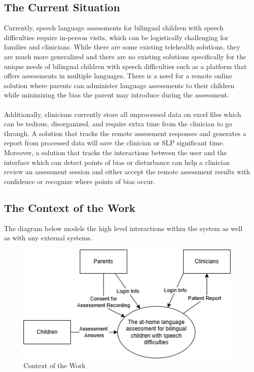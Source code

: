 \documentclass[12pt]{article}
\begin{document}
\subsection{The Current Situation}
\hspace{2em}Currently, speech language assessments for bilingual children with speech difficulties require in-person visits, which can be logistically challenging 
for families and clinicians. While there are some existing telehealth solutions, they are much more generalized and there are no existing solutions 
specifically for the unique needs of bilingual children with speech difficulties such as a platform that offers assessments in multiple languages. 
There is a need for a remote online solution where parents can administer language assessments to their children while minimizing the bias the parent 
may introduce during the assessment. \\\\
\indent Additionally, clinicians currently store all unprocessed data on excel files which can be tedious, disorganized, and require extra time from the clinician 
to go through. A solution that tracks the remote assessment responses and generates a report from processed data will save the clinician or SLP significant 
time. Moreover, a solution that tracks the interactions between the user and the interface which can detect points of bias or disturbance can help a clinician 
review an assessment session and either accept the remote assessment results with confidence or recognize where points of bias occur.

\newpage

\subsection{The Context of the Work}
\hspace{2em}The diagram below models the high level interactions within the system as well as with any external systems.
\begin{figure}[H]
  \centering
  \includegraphics[scale=0.7]{images/ContextoftheWork.png}
  \caption{Context of the Work}
\end{figure}
\end{document}
